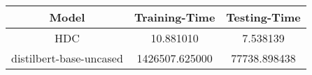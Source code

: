 \begin{tabular}{ccc}
\toprule
Model & Training-Time & Testing-Time \\
\midrule
HDC & 10.881010 & 7.538139 \\
distilbert-base-uncased & 1426507.625000 & 77738.898438 \\
\bottomrule
\end{tabular}

